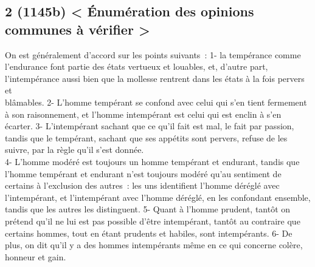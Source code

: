 \documentclass[french,twoside]{book} %
\begin{document}
\subsection[{2 (1145b) < Énumération des opinions communes à vérifier >}]{2 (1145b) < Énumération des opinions communes à vérifier >}
\noindent On est généralement d’accord sur les points suivants : 1- la tempérance comme l’endurance font partie des états vertueux et louables, et, d’autre part, l’intempérance aussi bien que la mollesse rentrent dans les états à la fois pervers et \\
blâmables. 2- L’homme tempérant se confond avec celui qui s’en tient fermement à son raisonnement, et l’homme intempérant est celui qui est enclin à s’en écarter. 3- L’intempérant sachant que ce qu’il fait est mal, le fait par passion, tandis que le tempérant, sachant que ses appétits sont pervers, refuse de les suivre, par la règle qu’il s’est donnée. \\
4- L’homme modéré est toujours un homme tempérant et endurant, tandis que l’homme tempérant et endurant n’est toujours modéré qu’au sentiment de certains à l’exclusion des autres : les uns identifient l’homme déréglé avec l’intempérant, et l’intempérant avec l’homme déréglé, en les confondant ensemble, tandis que les autres les distinguent. 5- Quant à l’homme prudent, tantôt on prétend qu’il ne lui est pas possible d’être intempérant, tantôt au contraire que certains hommes, tout en étant prudents et habiles, sont intempérants. 6- De \\
plus, on dit qu’il y a des hommes intempérants même en ce qui concerne colère, honneur et gain.
\end{document}
